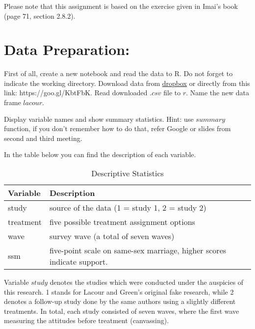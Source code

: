 \documentclass{article}\usepackage[]{graphicx}\usepackage[]{color}
\begin{document}
Please note that this assignment is based on the exercise given in Imai's book (page 71, section 2.8.2).

\section*{Data Preparation:}
\paragraph{}

First of all, create a new notebook and read the data to R. Do not forget to indicate the working directory. Download data from \href{https://www.dropbox.com/s/3wbrhg7byzltqlm/gay.csv?dl=0}{dropbox} or directly from this link: https://goo.gl/KbtFbK. Read downloaded $.csv$ file to $r$. Name the new data frame $lacour$. 

Display variable names and show summary statistics. Hint: use $summary$ function, if you don't remember how to do that, refer Google or slides from second and third meeting.

In the table below you can find the description of each variable.

\begin{table}[]
\centering
\caption{Descriptive Statistics}
\label{my-label}
\begin{tabular}{@{}ll@{}}
\toprule
Variable  & Description                                                            \\ \midrule
study     & source of the data (1 = study 1, 2 = study 2)                          \\
treatment & five possible treatment assignment options                             \\
wave      & survey wave (a total of seven waves)                                   \\
ssm       & five-point scale on same-sex marriage, higher scores indicate support. \\ \bottomrule
\end{tabular}
\end{table}

Variable $study$ denotes the studies which were conducted under the auspicies of this research. 1 stands for Lacour and Green's original fake research, while 2 denotes a follow-up study done by the same authors using a slightly different treatments. In total, each study consisted of seven waves, where the first wave measuring the attitudes before treatment (canvassing).
\end{document}
